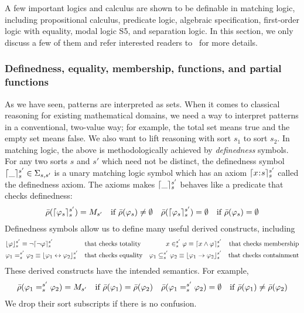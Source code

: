 \documentclass{amsart}
\begin{document}
A few important logics and calculus are shown to be definable 
in matching logic, including
propositional calculus, predicate logic,
algebraic specification, first-order logic with equality,
modal logic S5, and separation logic.
In this section, we only discuss a few of them and refer interested readers
to~\cite{bibid} for more details.

\subsubsection{Definedness, equality, membership, functions, and partial 
functions}

As we have seen, patterns are interpreted as sets.
When it comes to classical reasoning for existing mathematical domains,
we need a way to interpret patterns in a conventional, two-value way;
for example, the total set means true and the empty set means false.
We also want to lift reasoning with sort $s_1$ to sort $s_2$.
In matching logic, the above is methodologically achieved by
\emph{definedness} symbols.
For any two sorts $s$ and $s'$ which need not be distinct, 
the definedness symbol
$\lceil\_\rceil_{s}^{s'} \in \Sigma_{s,s'}$
is a unary matching logic symbol which has an axiom
$
\lceil x \mathbin{\!:\!} s\rceil_{s}^{s'}
$
called the definedness axiom. 
The axioms makes $\lceil\_\rceil_{s}^{s'}$ behaves like a predicate
that checks definedness:
\begin{align*}
& \bar{\rho}(\lceil\varphi_s\rceil_{s}^{s'}) = M_{s'}
  \quad \text{if $\bar{\rho}(\varphi_s) \neq \emptyset$}
& \bar{\rho}(\lceil\varphi_s\rceil_{s}^{s'}) = \emptyset
  \quad \text{if $\bar{\rho}(\varphi_s) = \emptyset$}
\end{align*}
Definedness symbols allow us to define many useful derived constructs, including
\begin{align*}
&\lfloor\varphi\rfloor_s^{s'} \equiv \neg \lceil\neg \varphi\rceil_s^{s'}
&& \text{that checks totality}
&x \in_s^{s'} \varphi \equiv \lceil x \wedge \varphi\rceil_s^{s'}
&& \text{that checks membership}
\\
&\varphi_1 =_s^{s'} \varphi_2 \equiv \lfloor\varphi_1 \leftrightarrow \varphi_2\rfloor_s^{s'}
&& \text{that checks equality}
&\varphi_1 \subseteq_s^{s'} \varphi_2 
\equiv \lfloor\varphi_1 \to \varphi_2\rfloor_s^{s'}
&& \text{that checks containment}
\end{align*}
These derived constructs have the intended semantics.
For example,
\begin{align*}
& \bar{\rho}(\varphi_1 =_{s}^{s'} \varphi_2) = M_{s'}
  \quad \text{if $\bar{\rho}(\varphi_1) = \bar{\rho}(\varphi_2)$}
& \bar{\rho}(\varphi_1 =_{s}^{s'} \varphi_2) = \emptyset
  \quad \text{if $\bar{\rho}(\varphi_1) \neq \bar{\rho}(\varphi_2)$}
\end{align*}
We drop their sort subscripts if there is no confusion.
\end{document}
